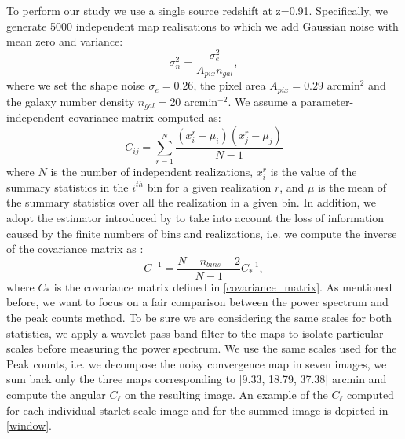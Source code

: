 \documentclass[twocolumn,twocolappendix]{aastex63}
\begin{document}
To perform our study we use a single source redshift at z=0.91. Specifically, we generate 5000 independent map realisations to which we add Gaussian noise with mean zero and variance:
 \begin{equation}
     \sigma^2_n= \frac{\sigma_e^2}{A_{pix}n_{gal}},
 \end{equation}
where we set the shape noise $\sigma_e = 0.26$, the pixel area $A_{pix}=0.29$ arcmin$^2$ and the galaxy number density $n_{gal}=20$ arcmin$^{-2}$.  
We assume a parameter-independent covariance matrix computed as:
\begin{equation}\label{covariance_matrix}
    C_{ij}=\sum_{r=1}^N
    \frac{(x_i^r-\mu_i)(x_j^r-\mu_j)}{N-1}
\end{equation}
where $N$ is the number of independent realizations, $x_i^r$ is the value of the summary statistics in the $i^{th}$ bin for a given realization $r$, and $\mu$ is the mean of the summary statistics over all the realization in a given bin. 
In addition, we adopt the estimator introduced by \cite{hartlap2007your} to take into account the loss of information caused by the finite numbers of bins and realizations, i.e. we compute the inverse of the covariance matrix as :
\begin{equation}
    C^{-1}=\frac{N-n_{bins}-2}{N-1}C_{*}^{-1},
\end{equation}
where $C_{*}$ is the covariance matrix defined in \autoref{covariance_matrix}. 
As mentioned before, we want to focus on a fair comparison between the power spectrum and the peak counts method. To be sure we are considering the same scales for both statistics, we apply a wavelet pass-band filter to the maps to isolate particular scales before measuring the power spectrum.  We use the same scales used for the Peak counts, i.e. we decompose the noisy convergence map in seven images, we sum back only the three maps corresponding to [9.33, 18.79, 37.38] arcmin and compute the angular $C_{\ell}$ on the resulting image.
An example of the $C_{\ell}$ computed for each individual starlet scale image and for the summed image is depicted in \autoref{window}.
\end{document}
